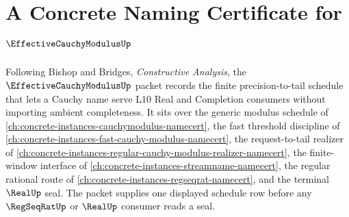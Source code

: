 \chapter{A Concrete Naming Certificate for $\EffectiveCauchyModulusUp$}
\label{ch:concrete-instances-effective-cauchy-modulus-namecert}

Following Bishop and Bridges, \emph{Constructive Analysis}, the $\EffectiveCauchyModulusUp$ packet records the finite precision-to-tail schedule that lets a Cauchy name serve L10 Real and Completion consumers without importing ambient completeness. It sits over the generic modulus schedule of \autoref{ch:concrete-instances-cauchymodulus-namecert}, the fast threshold discipline of \autoref{ch:concrete-instances-fast-cauchy-modulus-namecert}, the request-to-tail realizer of \autoref{ch:concrete-instances-regular-cauchy-modulus-realizer-namecert}, the finite-window interface of \autoref{ch:concrete-instances-streamname-namecert}, the regular rational route of \autoref{ch:concrete-instances-regseqrat-namecert}, and the terminal $\RealUp$ seal. The packet supplies one displayed schedule row before any $\RegSeqRatUp$ or $\RealUp$ consumer reads a seal.

